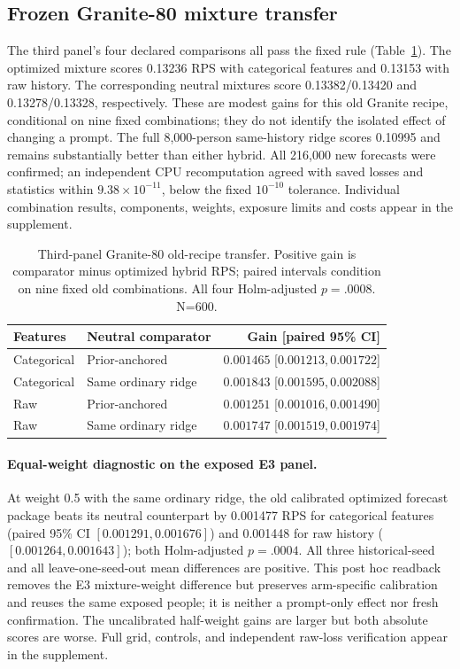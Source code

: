 \documentclass[sigconf,anonymous]{aamas}
\begin{document}
\subsection{Frozen Granite-80 mixture transfer}
The third panel's four declared comparisons all pass the fixed rule
(Table~\ref{tab:e3}). The optimized mixture scores 0.13236 RPS with categorical
features and 0.13153 with raw history. The corresponding neutral mixtures
score 0.13382/0.13420 and 0.13278/0.13328, respectively. These are modest
gains for this old Granite recipe, conditional on nine fixed combinations;
they do not identify the isolated effect of changing a prompt. The full
8,000-person same-history ridge scores 0.10995 and remains substantially
better than either hybrid. All 216,000 new forecasts were confirmed; an
independent CPU recomputation agreed with saved losses and statistics within
$9.38\times10^{-11}$, below the fixed $10^{-10}$ tolerance. Individual
combination results, components, weights, exposure limits and costs appear in
the supplement.

\begin{table}[t]\centering\scriptsize
\caption{Third-panel Granite-80 old-recipe transfer. Positive gain is
comparator minus optimized hybrid RPS; paired intervals condition on nine
fixed old combinations. All four Holm-adjusted $p=.0008$. N=600.}
\label{tab:e3}
\begin{tabular}{@{}llr@{}}\toprule
Features & Neutral comparator & Gain [paired 95\% CI]\\\midrule
Categorical & Prior-anchored & $0.001465$ [$0.001213,0.001722$]\\
Categorical & Same ordinary ridge & $0.001843$ [$0.001595,0.002088$]\\
Raw & Prior-anchored & $0.001251$ [$0.001016,0.001490$]\\
Raw & Same ordinary ridge & $0.001747$ [$0.001519,0.001974$]\\\bottomrule
\end{tabular}\end{table}

\paragraph{Equal-weight diagnostic on the exposed E3 panel.}
At weight 0.5 with the same ordinary ridge, the old calibrated optimized
forecast package beats its neutral counterpart by 0.001477 RPS for
categorical features (paired 95\% CI $[0.001291,0.001676]$) and 0.001448
for raw history ($[0.001264,0.001643]$); both Holm-adjusted $p=.0004$.
All three historical-seed and all leave-one-seed-out mean differences are
positive. This post hoc readback removes the E3 mixture-weight difference
but preserves arm-specific calibration and reuses the same exposed people;
it is neither a prompt-only effect nor fresh confirmation. The uncalibrated
half-weight gains are larger but both absolute scores are worse. Full grid,
controls, and independent raw-loss verification appear in the supplement.
\end{document}
